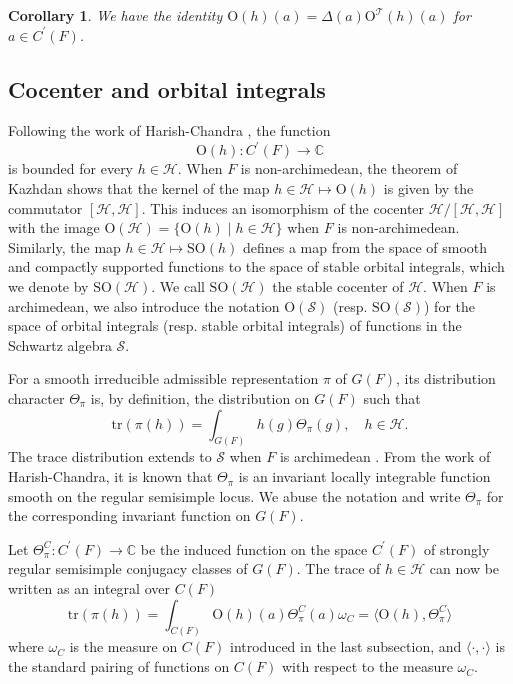 \documentclass[iccmp]{ipbook}
\newcommand{\BC}{{\mathbb {C}}}
\newcommand{\CH}{{\mathcal {H}}}
\newcommand{\CS}{{\mathcal {S}}}
\newcommand{\CT}{{\mathcal {T}}}
\newcommand{\RO}{{\mathrm {O}}}
\newcommand{\RS}{{\mathrm {S}}}
\newcommand{\tr}{{\mathrm{tr}}}
\def\Del{{\Delta}}
\def\ome{{\omega}}
\def\p{\prime}
\newtheorem{cor}[thm]{Corollary}
\begin{document}
\begin{cor}\label{cor:normalize:SOI}
We have the identity $\RO(h)(a) = \Del(a)\RO^\CT(h)(a)$ for $a\in C^\p(F)$.
\end{cor}


\subsection{Cocenter and orbital integrals}\label{subsec:CC-OI}

Following the work of Harish-Chandra \cite{HC70}\cite{varrealHC}, the function 
$$
\RO(h):C^\p(F)\to \BC
$$
is bounded for every $h\in \CH$. When $F$ is non-archimedean, the theorem of Kazhdan \cite{KazCus} shows that the kernel of the map $h\in \CH\mapsto \RO(h)$ is given by the commutator $[\CH,\CH]$. This induces an isomorphism of the cocenter $\CH/[\CH,\CH]$ with the image $\RO(\CH) = \{\RO(h)\mid h\in \CH\}$ when $F$ is non-archimedean. Similarly, the map $h\in \CH\mapsto \RS\RO(h)$ defines a map from the space of smooth and compactly supported functions to the space of stable orbital integrals, which we denote by $\RS\RO(\CH)$. We call $\RS\RO(\CH)$ the stable cocenter of $\CH$. When $F$ is archimedean, we also introduce the notation $\RO(\CS)$ (resp. $\RS\RO(\CS)$) for the space of orbital integrals (resp. stable orbital integrals) of functions in the Schwartz algebra $\CS$.

For a smooth irreducible admissible representation $\pi$ of $G(F)$, its distribution character $\Theta_\pi$ is, by definition, the distribution on $G(F)$ such that
$$
\tr(\pi(h)) = \int_{G(F)}
h(g)\Theta_\pi(g),\quad h\in \CH.
$$
The trace distribution extends to $\CS$ when $F$ is archimedean \cite[\S 8.1]{Wallach-RealI}.
From the work of Harish-Chandra, it is known that $\Theta_\pi$ is an invariant locally integrable function smooth on the regular semisimple locus. We abuse the notation and write $\Theta_\pi$ for the corresponding invariant function on $G(F)$.

Let $\Theta^C_\pi:C^\p(F)\to \BC$ be the induced function on the space $C^\p(F)$ of strongly regular semisimple conjugacy classes of $G(F)$. The trace of $h\in \CH$ can now be written as an integral over $C(F)$
\begin{equation}\label{eq:CC-OI:1}
\tr(\pi(h)) = \int_{C(F)}
\RO(h)(a)
\Theta^C_\pi(a)\ome_C = \langle \RO(h),\Theta^C_\pi\rangle
\end{equation}
where $\ome_C$ is the measure on $C(F)$ introduced in the last subsection, and $\langle \cdot,\cdot\rangle$ is the standard pairing of functions on $C(F)$ with respect to the measure $\ome_C$.
\end{document}
